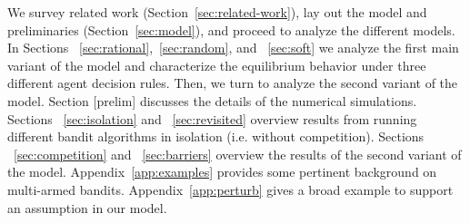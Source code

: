 {
We survey related work (Section~\ref{sec:related-work}), lay out the model and preliminaries (Section~\ref{sec:model}), and proceed to analyze the different models. In Sections ~\ref{sec:rational},~\ref{sec:random}, and ~\ref{sec:soft} we analyze the first main variant of the model and characterize the equilibrium behavior under three different agent decision rules. Then, we turn to analyze the second variant of the model. Section [prelim] discusses the details of the numerical simulations. Sections ~\ref{sec:isolation} and ~\ref{sec:revisited} overview results from running different bandit algorithms in isolation (i.e. without competition). Sections ~\ref{sec:competition} and ~\ref{sec:barriers} overview the results of the second variant of the model. Appendix~\ref{app:examples} provides some pertinent background on multi-armed bandits. Appendix~\ref{app:perturb} gives a broad example to support an assumption in our model.

}


